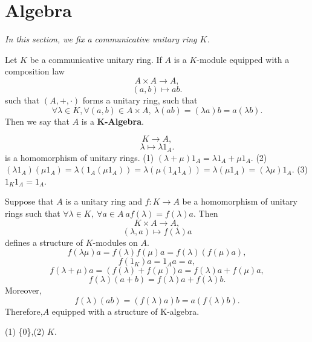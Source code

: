 \section{Algebra}
\textit{In this section, we fix a communicative unitary ring $K$.}
\begin{definitionenv}
    Let $K$ be a communicative unitary ring. If $A$ is a $K$-module equipped with a  composition law 
        $$A\times A\longrightarrow A,$$
    $$(a,b)\longmapsto a b.$$
    such that $(A,+,\cdot)$ forms a unitary ring, such that
     $$\forall \lambda\in K,\forall (a,b)\in A\times A, \ \lambda\left(ab\right)=\left(\lambda a\right)b=a\left(\lambda b\right).$$
     Then we say that $A$ is a \textbf{K-Algebra}.
\end{definitionenv}
\begin{remark}
    $$K\longrightarrow A,$$
    $$\lambda\longmapsto \lambda 1_A.$$
    is a homomorphism of unitary rings.
    \newline
    (1) $(\lambda+\mu)1_A=\lambda1_A+\mu1_A$.
    \newline
    (2) $\left(\lambda1_A\right)\left(\mu 1_A\right)=\lambda\left(1_A(\mu1_A)\right)=\lambda\left(\mu(1_A1_A)\right)=\lambda(\mu1_A)=(\lambda\mu)1_A$.
    \newline
    (3) $1_K1_A=1_A$.
\end{remark}
\begin{remark}
    Suppose that $A$ is a unitary ring and $f:K\longrightarrow A$ be a homomorphism of unitary rings such that  $\forall \lambda \in K,\ \forall a\in A \ af(\lambda)=f(\lambda)a.$ Then 
    $$K\times A\longrightarrow A,$$
    $$(\lambda,a)\longmapsto f(\lambda) a$$
    defines a structure of $K$-modules on $A$.
    $$f(\lambda\mu)a=f(\lambda)f(\mu)a=f(\lambda)\left(f(\mu)a\right),$$
    $$f(1_K)a=1_Aa=a,$$
    $$f(\lambda+\mu)a=\left(f(\lambda)+f(\mu)\right)a=f(\lambda )a+f(\mu)a,$$
    $$f(\lambda)(a+b)=f(\lambda)a+f(\lambda)b.$$
    Moreover, $$f(\lambda)(ab)=\left(f(\lambda)a\right)b=a\left(f(\lambda)b\right).$$
    Therefore,$A$ equipped with a structure of K-algebra.
\end{remark}
\begin{exampleenv}
    (1) \{0\},\quad (2) $K$.
\end{exampleenv}
